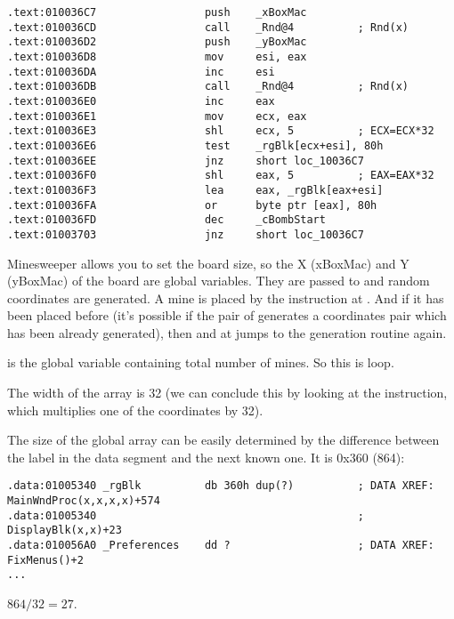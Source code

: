 \begin{lstlisting}[style=customasmx86]
.text:010036C7                 push    _xBoxMac
.text:010036CD                 call    _Rnd@4          ; Rnd(x)
.text:010036D2                 push    _yBoxMac
.text:010036D8                 mov     esi, eax
.text:010036DA                 inc     esi
.text:010036DB                 call    _Rnd@4          ; Rnd(x)
.text:010036E0                 inc     eax
.text:010036E1                 mov     ecx, eax
.text:010036E3                 shl     ecx, 5          ; ECX=ECX*32
.text:010036E6                 test    _rgBlk[ecx+esi], 80h
.text:010036EE                 jnz     short loc_10036C7
.text:010036F0                 shl     eax, 5          ; EAX=EAX*32
.text:010036F3                 lea     eax, _rgBlk[eax+esi]
.text:010036FA                 or      byte ptr [eax], 80h
.text:010036FD                 dec     _cBombStart
.text:01003703                 jnz     short loc_10036C7
\end{lstlisting}

Minesweeper allows you to set the board size, so the X (xBoxMac) and Y (yBoxMac) of the board are global variables.
They are passed to  and random 
coordinates are generated.
A mine is placed by the  instruction at . 
And if it has been placed before 
(it's possible if the pair of  
generates a coordinates pair which has been already 
generated), 
then  and  at  
jumps to the generation routine again.

 is the global variable containing total number of mines. So this is loop.

The width of the array is 32 
(we can conclude this by looking at the  instruction, which multiplies one of the coordinates by 32).

The size of the  
global array can be easily determined by the difference 
between the  
label in the data segment and the next known one. 
It is 0x360 (864):

\begin{lstlisting}[style=customasmx86]
.data:01005340 _rgBlk          db 360h dup(?)          ; DATA XREF: MainWndProc(x,x,x,x)+574
.data:01005340                                         ; DisplayBlk(x,x)+23
.data:010056A0 _Preferences    dd ?                    ; DATA XREF: FixMenus()+2
...
\end{lstlisting}

$864/32=27$.

